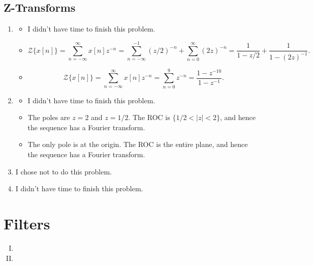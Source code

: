 \documentclass[11pt]{article}
\newcommand{\inv}{^{-1}}
\newcommand{\Zt}{\mathcal{Z}} %
\begin{document}
\subsection{Z-Transforms}
\begin{enumerate}
\item
\begin{itemize}
\item I didn't have time to finish this problem.

\item 
\[\Zt\{ x[n] \}
    = \sum_{n = -\infty}^\infty x[n] z^{-n}
    = \sum_{n = -\infty}^{-1} (z/2)^{-n}
    + \sum_{n = 0}^\infty (2z)^{-n}
    = \frac{1}{1 - z/2} + \frac{1}{1 - (2z)\inv}.
\]

\item
\[\Zt\{ x[n] \}
    = \sum_{n = -\infty}^\infty x[n] z^{-n}
    = \sum_{n = 0}^9 z^{-n}
    = \frac{1 - z^{-10}}{1 - z\inv}.
\]
\end{itemize}

\item 
\begin{itemize}
\item I didn't have time to finish this problem.

\item The poles are $z = 2$ and $z = 1/2$. The ROC is $\{1/2 < |z| < 2\}$, and
hence the sequence has a Fourier transform.

\item The only pole is at the origin.
The ROC is the entire plane, and hence the sequence has a Fourier transform.
\end{itemize}

\item I chose not to do this problem.

\item I didn't have time to finish this problem.

\end{enumerate}

\section{Filters}
\begin{enumerate}[I.]
\item

\item

\end{enumerate}
\end{document}
